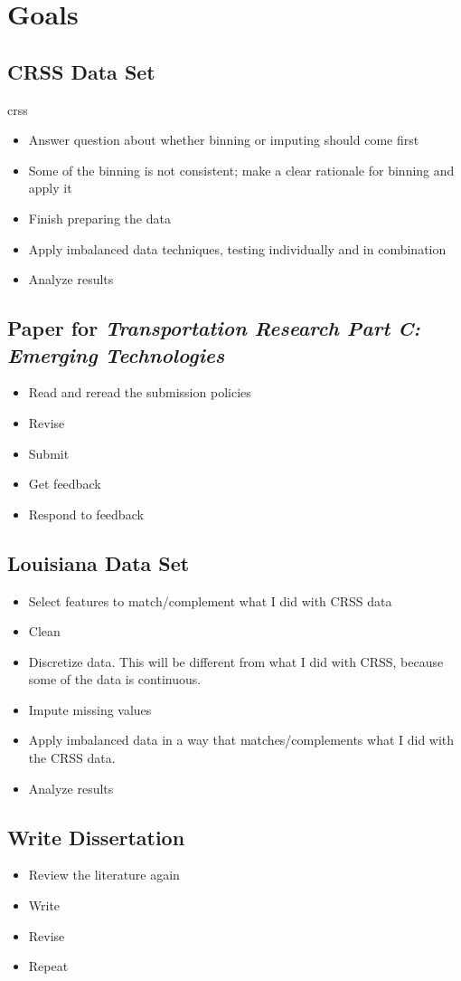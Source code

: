 \section{Goals}

\subsection{CRSS Data Set}

\acrfull{crss} \cite {CRSS}

\begin{itemize}
	\item Answer question about whether binning or imputing should come first
	\item Some of the binning is not consistent; make a clear rationale for binning and apply it
	\item Finish preparing the data
	\item Apply imbalanced data techniques, testing individually and in combination
	\item Analyze results
\end{itemize}

\subsection{Paper for {\it Transportation Research Part C:  Emerging Technologies}}

\begin{itemize}
	\item Read and reread the submission policies
	\item Revise
	\item Submit
	\item Get feedback
	\item Respond to feedback
\end{itemize}	

\subsection{Louisiana Data Set}

\begin{itemize}
	\item Select features to match/complement what I did with CRSS data
	\item Clean
	\item Discretize data.  This will be different from what I did with CRSS, because some of the data is continuous.
	\item Impute missing values
	\item Apply imbalanced data in a way that matches/complements what I did with the CRSS data.
	\item Analyze results
\end{itemize}

\subsection{Write Dissertation}

\begin{itemize}
	\item Review the literature again
	\item Write
	\item Revise
	\item Repeat
\end{itemize}


